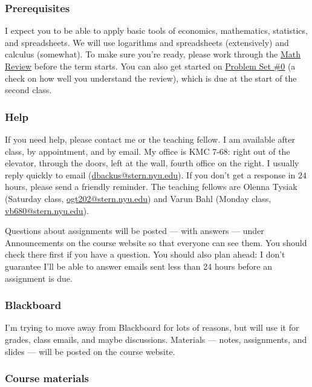 \documentclass[12pt]{article}
\begin{document}
\subsubsection*{Prerequisites}

I expect you to be able to apply basic tools of economics,
mathematics, statistics, and spreadsheets.  We will use
logarithms and spreadsheets (extensively) and calculus (somewhat).
To make sure you're ready,
please work through the
\href{http://www.stern.nyu.edu/~dbackus/2303/notes_math.pdf}{Math Review}
before the term starts.
You can also get started on
\href{http://www.stern.nyu.edu/~dbackus/2303/ps0_s12.pdf}{Problem Set \#0}
(a check on how well you understand the review),
which is due at the start of the second class.

\subsubsection*{Help}

If you need help, please contact me or the teaching fellow.
I am available after class, by appointment, and by email.
My office is KMC 7-68:
right out of the elevator, through the doors, left at the wall, fourth office on the right.
I usually reply quickly to email
(\href{mailto:dbackus@stern.nyu.edu}{dbackus@stern.nyu.edu}).
If you don't get a response in
24 hours, please send a friendly reminder.
The teaching fellows
are Olenna Tysiak (Saturday class,
\href{mailto:ogt202@stern.nyu.edu}{ogt202@stern.nyu.edu})
and Varun Bahl (Monday class,
\href{mailto:vb680@stern.nyu.edu}{vb680@stern.nyu.edu}).

Questions about assignments will be posted --- with answers ---
under Announcements on the course website so that everyone can see them.
You should check there first if you have a question.
You should also plan ahead:  I don't guarantee I'll be
able to answer emails sent
less than 24 hours before an assignment is due.

\subsubsection*{Blackboard}

I'm trying to move away from Blackboard for lots of reasons,
but will use it for grades, class emails, and maybe discussions.
Materials --- notes, assignments, and slides ---
will be posted on the course website.


\subsubsection*{Course materials}
\end{document}
